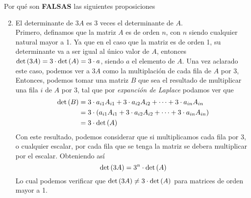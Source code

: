 \item Por qué son \textbf{FALSAS} las siguientes proposiciones
    \begin{enumerate}[label=\listAlph]
        \setcounter{enumii}{1}
        \item El determinante de \(3A\) es 3 veces el determinante de \(A\). \\
            Primero, definamos que la matriz \(A\) es de orden \(n\), con \(n\) siendo cualquier natural mayor a 1.
            Ya que en el caso que la matriz es de orden 1, su determinante va a ser igual al único valor de \(A\), 
            entonces \(\text{det} \left( 3A \right) = 3 \cdot \text{det} \left( A \right) = 3 \cdot a\), siendo \(a\) el elemento de \(A\).
            Una vez aclarado este caso, podemos ver a \(3A\) como la multiplación de cada fila de \(A\) por 3, 
            Entonces, podemos tomar una matriz \(B\) que sea el resultado de multiplicar una fila \(i\) de \(A\) por 3,
            tal que por \emph{expanción de Laplace} podamos ver que
            \[
                \begin{aligned}
                    \text{det} \left( B \right) &= 3 \cdot a_{i1}A_{i1} + 3 \cdot a_{i2}A_{i2} + \cdots + 3 \cdot a_{in}A_{in} \\
                    &= 3 \cdot \left(a_{i1}A_{i1} + 3 \cdot a_{i2}A_{i2} + \cdots + 3 \cdot a_{in}A_{in}\right) \\
                    &= 3 \cdot \text{det} \left( A \right)
                \end{aligned}
            \]
            Con este resultado, podemos considerar que si multiplicamos cada fila por 3, o cualquier escalar, por cada fila que se tenga 
            la matriz se debera multiplicar por el escalar. Obteniendo así
            \[
                \text{det} \left( 3A \right) = 3^n \cdot \text{det} \left( A \right)
            \]
            Lo cual podemos verificar que \(\text{det} \left( 3A \right) \neq 3 \cdot \text{det} \left( A \right)\) para matrices de orden mayor a 1.

\end{enumerate}
